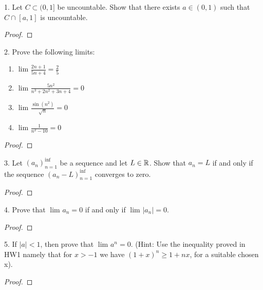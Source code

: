 
1. Let $C \subset (0, 1]$ be uncountable. Show that there exists $a \in \left( 0, 1 \right) $ such that $C \cap_{}^{} [a, 1]$ is uncountable.

\begin{proof}
		
\end{proof}

2. Prove the following limits:
\begin{enumerate}
	\item $\lim_{} \frac{2n+1}{5n+4} = \frac{2}{5}$
	\item $\lim_{} \frac{5n^{2}}{n^{3} + 2n^{2} + 3n + 4} = 0$
	\item $\lim_{} \frac{\sin\left( n^{2} \right) }{\sqrt{n} } = 0$
	\item $\lim_{} \frac{1}{n^{2} - 10} = 0$
\end{enumerate}

\begin{proof}
	
\end{proof}

3. Let $\left( a_n \right)_{n=1}^{\inf }$ be a sequence and let $L \in \mathbb{R}$. Show that $a_n = L$ if and only if the sequence $\left( a_n - L \right)_{n=1}^{\inf }$ converges to zero.

\begin{proof}
	
\end{proof}

4. Prove that $\lim_{} a_n = 0$ if and only if $\lim_{} \left|a_n\right| = 0$.

\begin{proof}
	
\end{proof}


5. If $\left|a\right| < 1$, then prove that $\lim_{} a^{n} = 0 $. (Hint: Use the inequality proved in HW1 namely that for $x > -1$ we have $\left( 1 + x \right)^{n} \ge 1 + nx$, for a suitable chosen x).

\begin{proof}
	
\end{proof}
